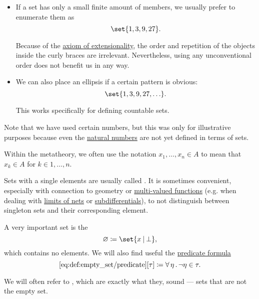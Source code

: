 \begin{definition}
\begin{itemize}
    \item If a set has only a small finite amount of members, we usually prefer to enumerate them as
    \begin{equation*}
      \set{ 1, 3, 9, 27 }.
    \end{equation*}

    Because of the \hyperref[def:naive_set_theory/extensionality]{axiom of extensionality}, the order and repetition of the objects inside the curly braces are irrelevant. Nevertheless, using any unconventional order does not benefit us in any way.

    \item We can also place an ellipsis if a certain pattern is obvious:
    \begin{equation*}
      \set{ 1, 3, 9, 27, \ldots }.
    \end{equation*}

    This works specifically for defining countable sets.
  \end{itemize}

  Note that we have used certain numbers, but this was only for illustrative purposes because even the \hyperref[def:set_of_natural_numbers]{natural numbers} are not yet defined in terms of sets.
\end{definition}

\begin{remark}\label{rem:multile_set_membership_shorthand}
  Within the metatheory, we often use the notation \( x_1, \ldots, x_n \in A \) to mean that \( x_k \in A \) for \( k \in 1, \ldots, n \).
\end{remark}

\begin{remark}\label{rem:singleton_sets}
  Sets with a single elements are usually called . It is sometimes convenient, especially with connection to geometry or \hyperref[def:multi_valued_function]{multi-valued functions} (e.g. when dealing with \hyperref[def:net_convergence/limit]{limits of nets} or \hyperref[def:subdifferentials]{subdifferentials}), to not distinguish between singleton sets and their corresponding element.
\end{remark}

\begin{definition}\label{def:empty_set}
  A very important set is the 
  \begin{equation*}
    \varnothing \coloneqq \set{ x \given \bot },
  \end{equation*}
  which contains no elements. We will also find useful the \hyperref[rem:predicate_formula]{predicate formula}
  \begin{equation*}\taglabel[\op{IsEmpty}]{eq:def:empty_set/predicate}
    \ref{eq:def:empty_set/predicate}[\tau] \coloneqq \qforall \eta \neg \eta \in \tau.
  \end{equation*}

  We will often refer to , which are exactly what they, sound --- sets that are not the empty set.
\end{definition}

